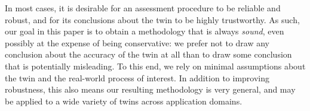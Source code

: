 
In most cases, it is desirable for an assessment procedure to be reliable and robust, and for its conclusions about the twin to be highly trustworthy.
As such, our goal in this paper is to obtain a methodology that is always \emph{sound}, even possibly at the expense of being conservative: we prefer not to draw any conclusion about the accuracy of the twin at all than to draw some conclusion that is potentially misleading.
To this end, we rely on minimal assumptions about the twin and the real-world process of interest.
In addition to improving robustness, this also means our resulting methodology is very general, and may be applied to a wide variety of twins across application domains.


